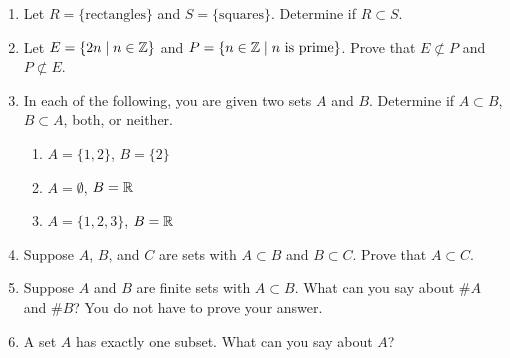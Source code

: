 \probsec{~\ref{sec:subsets}}
\begin{enumerate}
  \item Let $R = \{\text{rectangles}\}$ and $S = \{\text{squares}\}$. Determine if $R \subset S$.

  \item Let $E = \{2n \mid n \in \mathbb{Z}\}$ and $P = \{n \in \mathbb{Z} \mid n \text{ is prime}\}$. Prove that $E \not\subset P$ and $P \not\subset E$.

  \item In each of the following, you are given two sets $A$ and $B$. Determine if $A \subset B$, $B \subset A$, both, or neither.
\begin{enumerate}
    \item $A = \{1, 2\}$, $B = \{2\}$
    \item $A = \emptyset$, $B = \mathbb{R}$
    \item $A = \{1, 2, 3\}$, $B = \mathbb{R}$
\end{enumerate}


  \item Suppose $A$, $B$, and $C$ are sets with $A \subset B$ and $B \subset C$. Prove that $A \subset C$.

  \item Suppose $A$ and $B$ are finite sets with $A \subset B$. What can you say about $\# A$ and $\# B$? You do not have to prove your answer.

  \item A set $A$ has exactly one subset. What can you say about $A$?
\end{enumerate}
